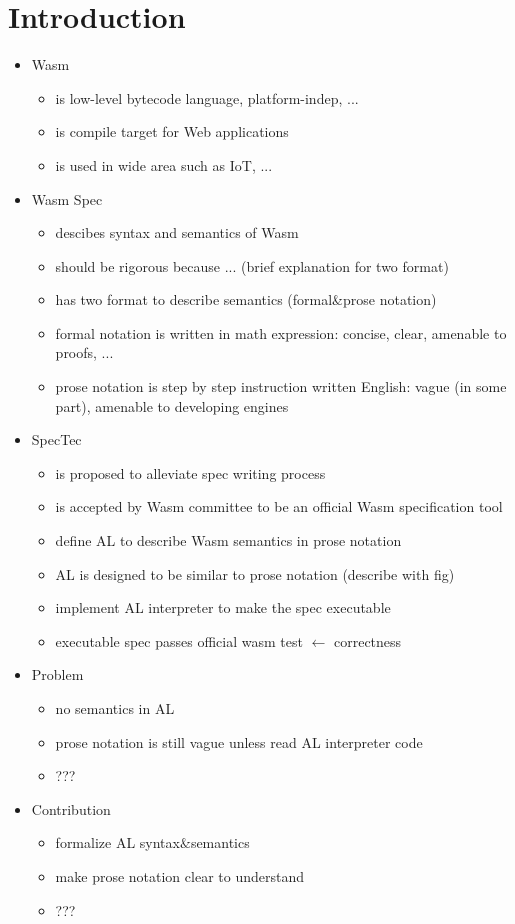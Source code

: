 
\chapter{Introduction}
\label{ch:intro}
\noindent

\begin{itemize}
\item Wasm
  \begin{itemize}
  \item is low-level bytecode language, platform-indep, ...
  \item is compile target for Web applications
  \item is used in wide area such as IoT, ...
  \end{itemize}
\item Wasm Spec
  \begin{itemize}
  \item descibes syntax and semantics of Wasm
  \item should be rigorous because ... (brief explanation for two format)
  \item has two format to describe semantics (formal\&prose notation)
  \item formal notation is written in math expression: concise, clear, amenable to proofs, ...
  \item prose notation is step by step instruction written English: vague (in some part), amenable to developing engines
  \end{itemize}
\item SpecTec
  \begin{itemize}
  \item is proposed to alleviate spec writing process
  \item is accepted by Wasm committee to be an official Wasm specification tool
  \item define AL to describe Wasm semantics in prose notation
  \item AL is designed to be similar to prose notation (describe with fig)
  \item implement AL interpreter to make the spec executable
  \item executable spec passes official wasm test $\leftarrow$ correctness
  \end{itemize}
\item Problem
  \begin{itemize}
  \item no semantics in AL
  \item prose notation is still vague unless read AL interpreter code
  \item ???
  \end{itemize}
\item Contribution
  \begin{itemize}
  \item formalize AL syntax$\&$semantics
  \item make prose notation clear to understand
  \item ???
  \end{itemize}
\end{itemize}


